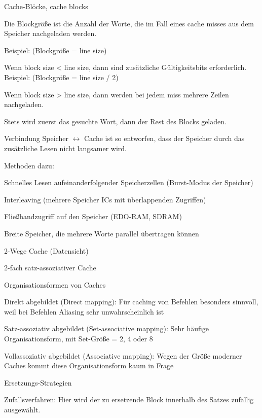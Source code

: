 \documentclass[10pt,landscape]{article}
\begin{document}
\begin{multicols}{3}
\begin{itemize*}
    \item Cache-Blöcke, cache blocks
    \item Die Blockgröße ist die Anzahl der Worte, die im Fall eines cache misses aus dem Speicher nachgeladen werden.
    \item Beispiel: (Blockgröße = line size)
    \item Wenn block size < line size, dann sind zusätzliche Gültigkeitsbits erforderlich. Beispiel: (Blockgröße = line size / 2)
    \item Wenn block size > line size, dann werden bei jedem miss mehrere Zeilen nachgeladen.
    \item Stets wird zuerst das gesuchte Wort, dann der Rest des Blocks geladen.
    \item Verbindung Speicher $\leftrightarrow$ Cache ist so entworfen, dass der Speicher durch das zusätzliche Lesen nicht langsamer wird.
    \item Methoden dazu:
    \begin{itemize*}
      \item Schnelles Lesen aufeinanderfolgender Speicherzellen (Burst-Modus der Speicher)
      \item Interleaving (mehrere Speicher ICs mit überlappenden Zugriffen)
      \item Fließbandzugriff auf den Speicher (EDO-RAM, SDRAM)
      \item Breite Speicher, die mehrere Worte parallel übertragen können
    \end{itemize*}
    \item 2-Wege Cache (Datensicht)
    \item 2-fach satz-assoziativer Cache
    \item Organisationsformen von Caches
    \item Direkt abgebildet (Direct mapping): Für caching von Befehlen besonders sinnvoll, weil bei Befehlen Aliasing sehr unwahrscheinlich ist
    \item Satz-assoziativ abgebildet (Set-associative mapping): Sehr häufige Organisationsform, mit Set-Größe = 2, 4 oder 8
    \item Vollassoziativ abgebildet (Associative mapping): Wegen der Größe moderner Caches kommt diese Organisationsform kaum in Frage
    \item Ersetzungs-Strategien
    \item Zufallsverfahren: Hier wird der zu ersetzende Block innerhalb des Satzes zufällig ausgewählt.

\end{itemize*}
\end{multicols}
\end{document}
